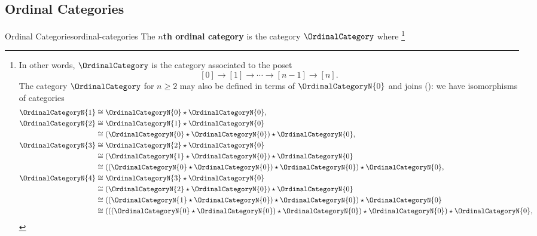 \subsection{Ordinal Categories}\label{subsection-ordinal-categories}
\begin{example}{Ordinal Categories}{ordinal-categories}%
    The \textbf{$n$th ordinal category} is the category $\OrdinalCategory$ where%
    \footnote{%
        In other words, $\OrdinalCategory$ is the category associated to the poset
        \[%
            [0]\to[1]\to\cdots\to[n-1]\to[n].%
        \]%
        The category $\OrdinalCategory$ for $n\geq2$ may also be defined in terms of $\OrdinalCategoryN{0}$ and joins (): we have isomorphisms of categories
        \begin{align*}
            \OrdinalCategoryN{1} &\cong \OrdinalCategoryN{0}\star\OrdinalCategoryN{0},\\
            \OrdinalCategoryN{2} &\cong \OrdinalCategoryN{1}\star\OrdinalCategoryN{0}\\
                                 &\cong (\OrdinalCategoryN{0}\star\OrdinalCategoryN{0})\star\OrdinalCategoryN{0},\\
            \OrdinalCategoryN{3} &\cong \OrdinalCategoryN{2}\star\OrdinalCategoryN{0}\\
                                 &\cong (\OrdinalCategoryN{1}\star\OrdinalCategoryN{0})\star\OrdinalCategoryN{0}\\
                                 &\cong ((\OrdinalCategoryN{0}\star\OrdinalCategoryN{0})\star\OrdinalCategoryN{0})\star\OrdinalCategoryN{0},\\
            \OrdinalCategoryN{4} &\cong \OrdinalCategoryN{3}\star\OrdinalCategoryN{0}\\
                                 &\cong (\OrdinalCategoryN{2}\star\OrdinalCategoryN{0})\star\OrdinalCategoryN{0}\\
                                 &\cong ((\OrdinalCategoryN{1}\star\OrdinalCategoryN{0})\star\OrdinalCategoryN{0})\star\OrdinalCategoryN{0}\\
                                 &\cong (((\OrdinalCategoryN{0}\star\OrdinalCategoryN{0})\star\OrdinalCategoryN{0})\star\OrdinalCategoryN{0})\star\OrdinalCategoryN{0},
        \end{align*}
}
\end{example}
